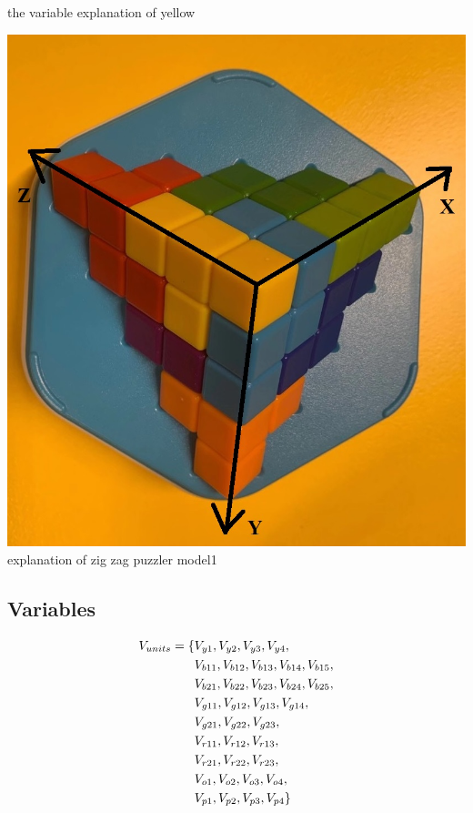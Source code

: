 \begin{center}
the variable explanation of yellow
\end{center}
\begin{center}
\includegraphics[scale=0.5]{ZIGZAGmodel1board.jpg} \\
explanation of zig zag puzzler model1
\end{center}
\subsection{Variables}
\begin{align*}
V_{units}=\{&V_{y1},V_{y2},V_{y3},V_{y4},\\&V_{b11},V_{b12},V_{b13},V_{b14},
V_{b15},\\&V_{b21},V_{b22},V_{b23},V_{b24},V_{b25},\\&V_{g11},V_{g12},V_{g13},V_{g14},\\&V_{g21},V_{g22},V_{g23},\\&V_{r11},
V_{r12},V_{r13},\\&V_{r21},V_{r22},V_{r23},\\&V_{o1},V_{o2},V_{o3},V_{o4},\\&V_{p1},V_{p2},V_{p3},V_{p4}\}
\end{align*}
